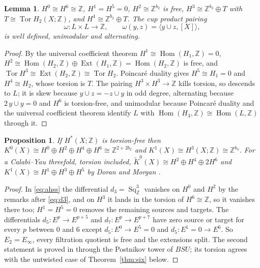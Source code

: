 \documentclass[reqno,11pt]{amsart}
\newtheorem{proposition}[theorem]{Proposition}
\newtheorem{lemma}[theorem]{Lemma}
\theoremstyle{definition}
\newcommand{\ZZ}{\mathbb{Z}}
\newcommand{\Sq}{\operatorname{Sq}}
\DeclareMathOperator{\Tor}{Tor}
\DeclareMathOperator{\Hom}{Hom}
\DeclareMathOperator{\Ext}{Ext}
\begin{document}
\begin{lemma}\label{lem:cohomology}
$H^0\cong H^6\cong\ZZ$, $H^1=H^5=0$, $H^2\cong\ZZ^{b_2}$ is free, $H^3\cong\ZZ^{b_3}\oplus T$ with $T\cong\Tor H_2(X;\ZZ)$, and $H^4\cong\ZZ^{b_2}\oplus T$. The cup product pairing
\begin{equation}\label{eq:omega}
\omega\colon L\times L\to\ZZ,\qquad\omega(y,z)=\langle y\cup z,[X]\rangle,
\end{equation}
is well defined, unimodular and alternating.
\end{lemma}

\begin{proof}
By the universal coefficient theorem $H^1\cong\Hom(H_1,\ZZ)=0$, $H^2\cong\Hom(H_2,\ZZ)\oplus\Ext(H_1,\ZZ)=\Hom(H_2,\ZZ)$ is free, and $\Tor H^3\cong\Ext(H_2,\ZZ)\cong\Tor H_2$. Poincar\'e duality gives $H^5\cong H_1=0$ and $H^4\cong H_2$, whose torsion is $T$. The pairing $H^3\times H^3\to\ZZ$ kills torsion, so descends to $L$; it is skew because $y\cup z=-z\cup y$ in odd degree, alternating because $2\,y\cup y=0$ and $H^6$ is torsion-free, and unimodular because Poincar\'e duality and the universal coefficient theorem identify $L$ with $\Hom(H_3,\ZZ)\cong\Hom(L,\ZZ)$ through it.
\end{proof}

\begin{proposition}\label{prop:untwistedsix}
If $H^*(X;\ZZ)$ is torsion-free then $K^0(X)\cong H^0\oplus H^2\oplus H^4\oplus H^6\cong\ZZ^{2+2b_2}$ and $K^1(X)\cong H^3(X;\ZZ)\cong\ZZ^{b_3}$. For a Calabi--Yau threefold, torsion included, $\widetilde K^0(X)\cong H^2\oplus H^4\oplus 2H^6$ and $K^1(X)\cong H^1\oplus H^3\oplus H^5$ by Doran and Morgan \cite{DM07}.
\end{proposition}

\begin{proof}
In \eqref{eq:ahss} the differential $d_3=\Sq^3_\ZZ$ vanishes on $H^0$ and $H^2$ by the remarks after \eqref{eq:d3}, and on $H^3$ it lands in the torsion of $H^6\cong\ZZ$, so it vanishes there too; $H^1=H^5=0$ removes the remaining sources and targets. The differentials $d_5\colon E^{p}\to E^{p+5}$ and $d_7\colon E^p\to E^{p+7}$ have zero source or target for every $p$ between $0$ and $6$ except $d_5\colon E^{0}\to E^{5}=0$ and $d_5\colon E^1=0\to E^6$. So $E_2=E_\infty$, every filtration quotient is free and the extensions split. The second statement is proved in \cite{DM07} through the Postnikov tower of $BSU$; its torsion agrees with the untwisted case of Theorem~\ref{thm:six} below.
\end{proof}
\end{document}
